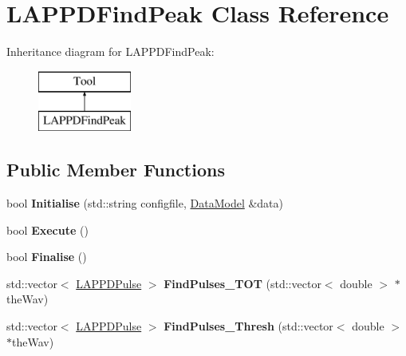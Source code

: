 \hypertarget{classLAPPDFindPeak}{\section{L\-A\-P\-P\-D\-Find\-Peak Class Reference}
\label{classLAPPDFindPeak}
}
Inheritance diagram for L\-A\-P\-P\-D\-Find\-Peak\-:\begin{figure}[H]
\begin{center}
\leavevmode
\includegraphics[height=2.000000cm]{classLAPPDFindPeak}
\end{center}
\end{figure}
\subsection*{Public Member Functions}
\begin{DoxyCompactItemize}
\item 
\hypertarget{classLAPPDFindPeak_aac02ab0efc1d6f2ac438a50a6dd48b51}{bool {\bfseries Initialise} (std\-::string configfile, \hyperlink{classDataModel}{Data\-Model} \&data)}\label{classLAPPDFindPeak_aac02ab0efc1d6f2ac438a50a6dd48b51}

\item 
\hypertarget{classLAPPDFindPeak_aeb178a0e7f0182bcec6aec80de1fd80c}{bool {\bfseries Execute} ()}\label{classLAPPDFindPeak_aeb178a0e7f0182bcec6aec80de1fd80c}

\item 
\hypertarget{classLAPPDFindPeak_a1c31ce2e8918e04c9e051a8c7eef304c}{bool {\bfseries Finalise} ()}\label{classLAPPDFindPeak_a1c31ce2e8918e04c9e051a8c7eef304c}

\item 
\hypertarget{classLAPPDFindPeak_aec4e759a18ce8bd5eda0ed4c1460ea4d}{std\-::vector$<$ \hyperlink{classLAPPDPulse}{L\-A\-P\-P\-D\-Pulse} $>$ {\bfseries Find\-Pulses\-\_\-\-T\-O\-T} (std\-::vector$<$ double $>$ $\ast$the\-Wav)}\label{classLAPPDFindPeak_aec4e759a18ce8bd5eda0ed4c1460ea4d}

\item 
\hypertarget{classLAPPDFindPeak_a705d781b236ed980dc6f6d4a297a5761}{std\-::vector$<$ \hyperlink{classLAPPDPulse}{L\-A\-P\-P\-D\-Pulse} $>$ {\bfseries Find\-Pulses\-\_\-\-Thresh} (std\-::vector$<$ double $>$ $\ast$the\-Wav)}\label{classLAPPDFindPeak_a705d781b236ed980dc6f6d4a297a5761}

\end{DoxyCompactItemize}
